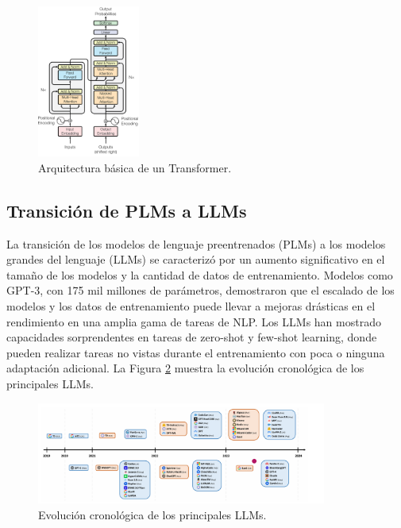 \begin{figure}[h]
\centering
\includegraphics[width=0.3\textwidth]{figuras/capitulo1/transformer_architecture.png}
\caption{Arquitectura básica de un Transformer.}
\label{fig:transformer_architecture}
\end{figure}

\subsection{Transición de PLMs a LLMs}
La transición de los modelos de lenguaje preentrenados (PLMs) a los modelos grandes del lenguaje (LLMs) se caracterizó por un aumento significativo en el tamaño de los modelos y la cantidad de datos de entrenamiento. Modelos como GPT-3, con 175 mil millones de parámetros, demostraron que el escalado de los modelos y los datos de entrenamiento puede llevar a mejoras drásticas en el rendimiento en una amplia gama de tareas de NLP. Los LLMs han mostrado capacidades sorprendentes en tareas de zero-shot y few-shot learning, donde pueden realizar tareas no vistas durante el entrenamiento con poca o ninguna adaptación adicional. La Figura \ref{fig:llm_evolution} muestra la evolución cronológica de los principales LLMs.

\begin{figure}[h]
\centering
\includegraphics[width=0.85\textwidth]{figuras/capitulo1/llm_evolution.png}
\caption{Evolución cronológica de los principales LLMs.}
\label{fig:llm_evolution}
\end{figure}



